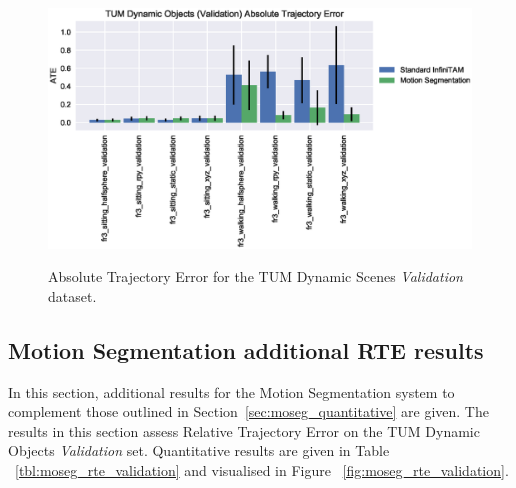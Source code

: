 \begin{figure}[!htbp]
~\label{fig:moseg_ate_validation}
  \centering
  \includegraphics[width=0.95\linewidth]{figures/moseg/ate_validation.eps}
  \caption[Motion Segmentation ATE Validation Set]
  {Absolute Trajectory Error for the TUM Dynamic Scenes
    \textit{Validation} dataset.}
\end{figure}

\subsection{Motion Segmentation additional RTE results}
In this section, additional results for the Motion Segmentation system
to complement those outlined in Section~\ref{sec:moseg_quantitative} are given.
The results in this section assess Relative Trajectory Error on the TUM Dynamic
Objects \textit{Validation} set. Quantitative results are given in Table
~\ref{tbl:moseg_rte_validation} and visualised in Figure
~\ref{fig:moseg_rte_validation}.

